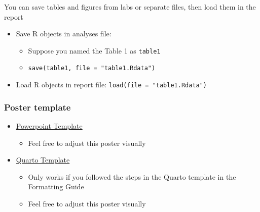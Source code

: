 \documentclass[
  letterpaper,
  DIV=11,
  numbers=noendperiod]{scrartcl}
\providecommand{\tightlist}{%
  \setlength{\itemsep}{0pt}\setlength{\parskip}{0pt}}\usepackage{longtable,booktabs,array}
\begin{document}
\begin{tcolorbox}[enhanced jigsaw, coltitle=black, bottomtitle=1mm, breakable, opacityback=0, toprule=.15mm, left=2mm, opacitybacktitle=0.6, rightrule=.15mm, colframe=quarto-callout-note-color-frame, toptitle=1mm, bottomrule=.15mm, arc=.35mm, titlerule=0mm, title=\textcolor{quarto-callout-note-color}{\faInfo}\hspace{0.5em}{The project report is a separate file from the labs}, leftrule=.75mm, colbacktitle=quarto-callout-note-color!10!white, colback=white]

You can save tables and figures from labs or separate files, then load
them in the report

\begin{itemize}
\tightlist
\item
  Save R objects in analyses file:

  \begin{itemize}
  \tightlist
  \item
    Suppose you named the Table 1 as \texttt{table1}
  \item
    \texttt{save(table1,\ file\ =\ "table1.Rdata")}
  \end{itemize}
\item
  Load R objects in report file: \texttt{load(file\ =\ "table1.Rdata")}
\end{itemize}

\end{tcolorbox}

\subsubsection{Poster template}\label{poster-template}

\begin{itemize}
\tightlist
\item
  \href{https://ohsuitg-my.sharepoint.com/:p:/r/personal/wakim_ohsu_edu/Documents/Teaching/Classes/W25_BSTA_512_612/Student_files/Project/Resources/poster_template.pptx?d=w171b4f2e4f1d4ee1a72f499f15d736af&csf=1&web=1&e=Nsqqqs}{Powerpoint
  Template}

  \begin{itemize}
  \tightlist
  \item
    Feel free to adjust this poster visually
  \end{itemize}
\item
  \href{../labs/Poster-example.qmd}{Quarto Template}

  \begin{itemize}
  \tightlist
  \item
    Only works if you followed the steps in the Quarto template in the
    Formatting Guide
  \item
    Feel free to adjust this poster visually
  \end{itemize}
\end{itemize}
\end{document}
